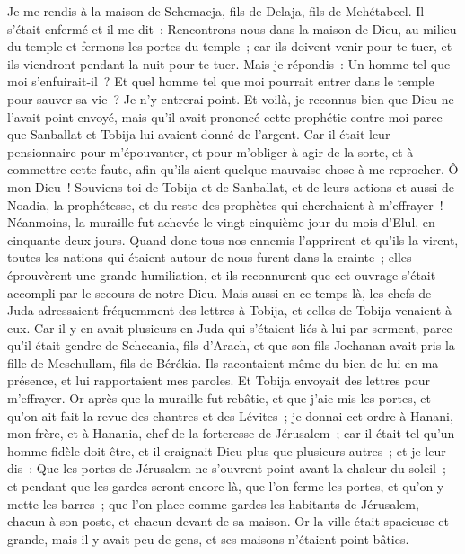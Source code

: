 \begin{multicols}{2}
Je me rendis à la maison de Schemaeja, fils de Delaja, fils de Mehétabeel. Il s'était enfermé et il me dit~: Rencontrons-nous dans la maison de Dieu, au milieu du temple et fermons les portes du temple~; car ils doivent venir pour te tuer, et ils viendront pendant la nuit pour te tuer.
Mais je répondis~: Un homme tel que moi s'enfuirait-il~? Et quel homme tel que moi pourrait entrer dans le temple pour sauver sa vie~? Je n'y entrerai point.
Et voilà, je reconnus bien que Dieu ne l'avait point envoyé, mais qu'il avait prononcé cette prophétie contre moi parce que Sanballat et Tobija lui avaient donné de l'argent.
Car il était leur pensionnaire pour m'épouvanter, et pour m'obliger à agir de la sorte, et à commettre cette faute, afin qu'ils aient quelque mauvaise chose à me reprocher.
Ô mon Dieu~! Souviens-toi de Tobija et de Sanballat, et de leurs actions et aussi de Noadia, la prophétesse, et du reste des prophètes qui cherchaient à m'effrayer~!
Néanmoins, la muraille fut achevée le vingt-cinquième jour du mois d'Elul, en cinquante-deux jours.
Quand donc tous nos ennemis l'apprirent et qu'ils la virent, toutes les nations qui étaient autour de nous furent dans la crainte~; elles éprouvèrent une grande humiliation, et ils reconnurent que cet ouvrage s'était accompli par le secours de notre Dieu.
Mais aussi en ce temps-là, les chefs de Juda adressaient fréquemment des lettres à Tobija, et celles de Tobija venaient à eux.
Car il y en avait plusieurs en Juda qui s'étaient liés à lui par serment, parce qu'il était gendre de Schecania, fils d'Arach, et que son fils Jochanan avait pris la fille de Meschullam, fils de Bérékia.
Ils racontaient même du bien de lui en ma présence, et lui rapportaient mes paroles. Et Tobija envoyait des lettres pour m'effrayer.
\VerseOne{}Or après que la muraille fut rebâtie, et que j'aie mis les portes, et qu'on ait fait la revue des chantres et des Lévites~; 
je donnai cet ordre à Hanani, mon frère, et à Hanania, chef de la forteresse de Jérusalem~; car il était tel qu'un homme fidèle doit être, et il craignait Dieu plus que plusieurs autres~;
et je leur dis~: Que les portes de Jérusalem ne s'ouvrent point avant la chaleur du soleil~; et pendant que les gardes seront encore là, que l'on ferme les portes, et qu'on y mette les barres~; que l'on place comme gardes les habitants de Jérusalem, chacun à son poste, et chacun devant de sa maison.
Or la ville était spacieuse et grande, mais il y avait peu de gens, et ses maisons n'étaient point bâties.

\end{multicols}
